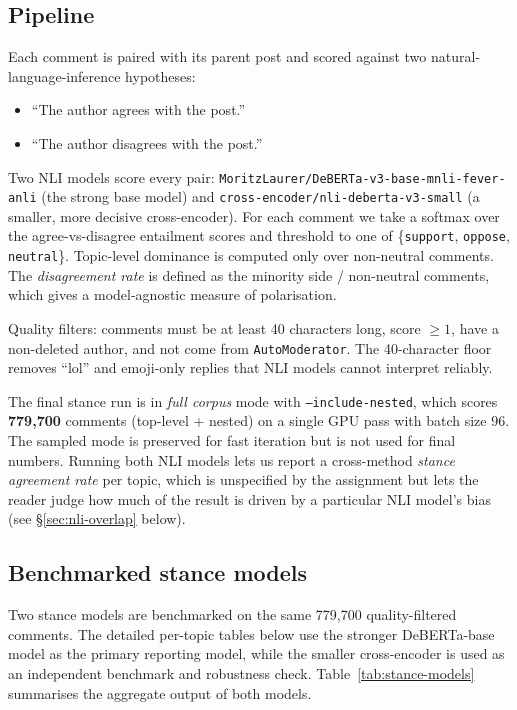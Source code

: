 \documentclass[11pt,a4paper]{article}
\newenvironment{extrabox}{%
  \par\medskip\noindent
  \def\FrameCommand{\fboxsep=6pt\fboxrule=0.6pt%
    \fcolorbox{extraboxrule}{extraboxbg}}%
  \MakeFramed{\advance\hsize-2\fboxsep\FrameRestore}%
  \noindent{\sffamily\bfseries\color{extraboxrule}Extra step.}\quad\ignorespaces%
}{\endMakeFramed\par\medskip}
\newenvironment{designbox}{%
  \par\medskip\noindent
  \def\FrameCommand{\fboxsep=6pt\fboxrule=0.4pt%
    \fcolorbox{designboxrule}{designboxbg}}%
  \MakeFramed{\advance\hsize-2\fboxsep\FrameRestore}%
  \noindent{\sffamily\bfseries Design choice.}\quad\ignorespaces%
}{\endMakeFramed\par\medskip}
\begin{document}
\subsection{Pipeline}
Each comment is paired with its parent post and scored against two natural-language-inference
hypotheses:

\begin{itemize}
  \item ``The author agrees with the post.''
  \item ``The author disagrees with the post.''
\end{itemize}

Two NLI models score every pair: \texttt{MoritzLaurer/DeBERTa-v3-base-mnli-fever-anli}
(the strong base model) and \texttt{cross-encoder/nli-deberta-v3-small} (a smaller, more
decisive cross-encoder). For each comment we take a softmax over the agree-vs-disagree
entailment scores and threshold to one of \{\texttt{support}, \texttt{oppose}, \texttt{neutral}\}.
Topic-level dominance is computed only over non-neutral comments.
The \emph{disagreement rate} is defined as the minority side / non-neutral comments,
which gives a model-agnostic measure of polarisation.

\begin{designbox}
Quality filters: comments must be at least 40 characters long, score $\geq 1$, have a
non-deleted author, and not come from \texttt{AutoModerator}. The 40-character floor
removes ``lol'' and emoji-only replies that NLI models cannot interpret reliably.
\end{designbox}

\begin{extrabox}
The final stance run is in \emph{full corpus} mode with \texttt{--include-nested}, which scores
\textbf{779{,}700} comments (top-level + nested) on a single GPU pass with batch size 96. The
sampled mode is preserved for fast iteration but is not used for final numbers. Running both NLI
models lets us report a cross-method \emph{stance agreement rate} per topic, which is unspecified
by the assignment but lets the reader judge how much of the result is driven by a particular
NLI model's bias (see \S\ref{sec:nli-overlap} below).
\end{extrabox}

\subsection{Benchmarked stance models}

Two stance models are benchmarked on the same 779{,}700 quality-filtered comments. The detailed
per-topic tables below use the stronger DeBERTa-base model as the primary reporting model, while
the smaller cross-encoder is used as an independent benchmark and robustness check. Table~\ref{tab:stance-models}
summarises the aggregate output of both models.
\end{document}
